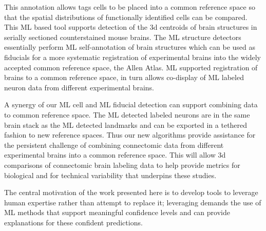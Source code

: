 \documentclass[11pt]{article}
\begin{document}
This annotation allows tags cells to be placed into a common reference
space so that the spatial distributions of functionally identified
cells can be compared. This ML based tool supports detection of the 3d
centroids of brain structures in serially sectioned counterstained
mouse brains. The ML structure detectors essentially perform ML
self-annotation of brain structures which can be used as fiducials for
a more systematic registration of experimental brains into the widely
accepted common reference space, the Allen Atlas. ML supported
registration of brains to a common reference space, in turn allows
co-display of ML labeled neuron data from different experimental
brains.

A synergy of our ML cell and ML fiducial detection can support
combining data to common reference space. The ML detected labeled
neurons are in the same brain stack as the ML detected landmarks and
can be exported in a tethered fashion to new reference spaces. Thus
our new algorithms provide assistance for the persistent challenge of
combining connectomic data from different experimental brains into a
common reference space. This will allow 3d comparisons of connectomic
brain labeling data to help provide metrics for biological and for
technical variability that underpins these studies.

The central motivation of the work presented here is to develop tools
to leverage human expertise rather than attempt to replace it;
leveraging demands the use of ML methods that support meaningful
confidence levels and can provide explanations for these confident
predictions.

 
 
\end{document}
